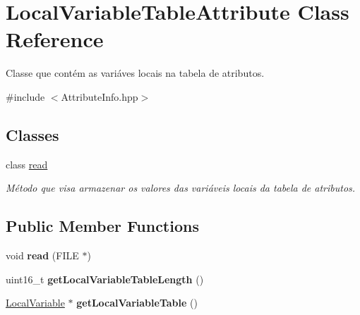 \hypertarget{classLocalVariableTableAttribute}{}\section{Local\+Variable\+Table\+Attribute Class Reference}
\label{classLocalVariableTableAttribute}


Classe que contém as variáves locais na tabela de atributos.  




{\ttfamily \#include $<$Attribute\+Info.\+hpp$>$}

\subsection*{Classes}
\begin{DoxyCompactItemize}
\item 
class \hyperlink{classLocalVariableTableAttribute_1_1read}{read}
\begin{DoxyCompactList}\small\item\em Método que visa armazenar os valores das variáveis locais da tabela de atributos. \end{DoxyCompactList}\end{DoxyCompactItemize}
\subsection*{Public Member Functions}
\begin{DoxyCompactItemize}
\item 
void {\bfseries read} (F\+I\+LE $\ast$)\hypertarget{classLocalVariableTableAttribute_a1c9144f74ddf8329deff7e2ffa05541a}{}\label{classLocalVariableTableAttribute_a1c9144f74ddf8329deff7e2ffa05541a}

\item 
uint16\+\_\+t {\bfseries get\+Local\+Variable\+Table\+Length} ()\hypertarget{classLocalVariableTableAttribute_aa140edc8a31d1d105b5430af9c1d5d26}{}\label{classLocalVariableTableAttribute_aa140edc8a31d1d105b5430af9c1d5d26}

\item 
\hyperlink{classLocalVariable}{Local\+Variable} $\ast$ {\bfseries get\+Local\+Variable\+Table} ()\hypertarget{classLocalVariableTableAttribute_a0fc8c4b5571871e61bee2bf4b0dc05a1}{}\label{classLocalVariableTableAttribute_a0fc8c4b5571871e61bee2bf4b0dc05a1}

\end{DoxyCompactItemize}


